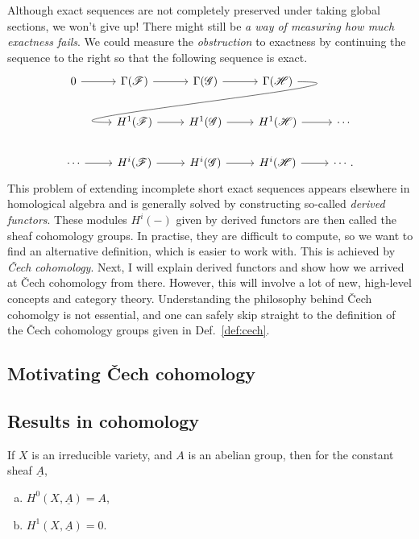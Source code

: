 Although exact sequences are not completely preserved under taking
global sections, we won't give up! There might still be \emph{a way of
measuring how much exactness fails}. We could measure the
\emph{obstruction} to exactness by continuing the sequence to the right
so that the following sequence is exact.
\[
\begin{tikzcd}
  0 \rar & \Gamma(\mathscr{F}) \rar & \Gamma(\mathscr{G})
  \rar & \Gamma(\mathscr{H})
  \arrow[out=0, in=180, looseness=1.5, overlay]{dll} & \\
    & H^{1}(\mathscr{F}) \rar & H^{1}(\mathscr{G})
  \rar & H^{1}(\mathscr{H}) \rar & \cdots \\
  \cdots \rar& H^{i}(\mathscr{F}) \rar & H^{i}(\mathscr{G})
  \rar & H^{i}(\mathscr{H}) \rar & \cdots.
\end{tikzcd}
\]
This problem of extending incomplete short exact sequences appears
elsewhere in homological algebra and is generally solved by constructing
so-called \emph{derived functors}. These modules $H^{i}(-)$ given by derived
functors are then called the sheaf cohomology groups. In practise, they are
difficult to compute, so we want to find an alternative definition,
which is easier to work with. This is achieved by \emph{\v Cech cohomology}.
Next, I will explain derived functors and show how we arrived at \v Cech
cohomology from there. However, this will involve a lot of new, high-level
concepts and category theory. Understanding the philosophy behind
\v Cech cohomolgy is not essential, and one can safely skip straight to the
definition of the \v Cech cohomology groups given in Def.~\ref{def:cech}.

\subsection{Motivating \v Cech cohomology}


\subsection{Results in cohomology}

\begin{prop}\label{prop:const_sheaf}
  If $X$ is an irreducible variety, and $A$ is an abelian group,
  then for the constant sheaf $\underline{A}$,
  \begin{enumerate}[(a)]
    \item $H^{0}(X,\underline{A}) = A$,
    \item $H^{1}(X,\underline{A})=0$.
  \end{enumerate}
\end{prop}
